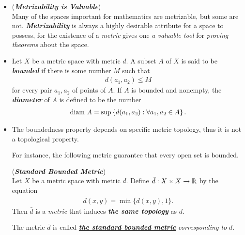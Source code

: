 \documentclass[11pt]{article}
\begin{document}
\begin{itemize}
\item \begin{remark} (\emph{\textbf{Metrizability is Valuable}})\\
Many of the spaces important for mathematics are metrizable, but some are not. \emph{\textbf{Metrizability}} is always a highly desirable attribute for a space to possess, for the  existence of a \emph{metric} gives one \emph{a valuable tool} for \emph{proving theorems} about the space.
\end{remark}

\item \begin{definition}
Let $X$ be a metric space with metric $d$. A subset $A$ of $X$ is said to be \emph{\textbf{bounded}} if there is some number $M$ such that
\begin{align*}
d(a_1, a_2) \le M
\end{align*} for every pair $a_1, a_2$ of points of $A$. If $A$ is bounded and nonempty, the \emph{\textbf{diameter}} of $A$ is defined to be the number
\begin{align*}
\text{diam }A = \sup\left\{d(a_1, a_2): \forall a_1, a_2 \in A\right\}.
\end{align*}
\end{definition}

\item \begin{remark}
The boundedness property depends on specific metric topology, thus it is not a topological property. 

For instance, the following metric  guarantee that every open set is bounded.
\begin{definition} (\emph{\textbf{Standard Bounded Metric}}) \\
Let $X$ be a metric space with metric $d$. Define $\bar{d} : X \times X \rightarrow {\mathbb R}$ by the equation
\begin{align*}
\bar{d}(x, y) =\min\{d(x, y), 1\}.
\end{align*}
Then $\bar{d}$ is a \emph{metric} that induces \emph{\textbf{the same topology}} as $d$. 

The metric $\bar{d}$ is called \underline{\emph{\textbf{the standard bounded metric}}} \emph{corresponding to} $d$.
\end{definition}
\end{remark}


\end{itemize}
\end{document}

